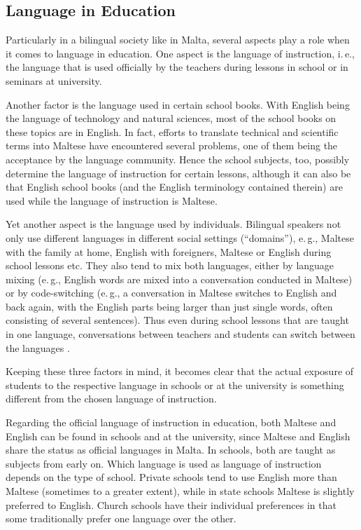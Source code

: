 \begin{multicols}{2}
\subsection{Language in Education}

Particularly in a bilingual society like in Malta, several aspects play a role when it comes to language in education. 
%
One aspect is the language of instruction, i.\,e., the language that is used officially by the teachers during lessons in school or in seminars at university. 

Another factor is the language used in certain school books. With English being the language of technology and natural sciences, most of the school books on these topics are in English. In fact, efforts to translate technical and scientific terms into Maltese have encountered several problems, one of them being the acceptance by the language community. Hence the school subjects, too, possibly determine the language of instruction for certain lessons, although it can also be that English school books (and the English terminology contained therein) are used while the language of instruction is Maltese.

Yet another aspect is the language used by individuals. Bilingual speakers not only use different languages in different social settings (``domains''), e.\,g., Maltese with the family at home, English with foreigners, Maltese or English during school lessons etc. They also tend to mix both languages, either by language mixing (e.\,g., English words are mixed into a conversation conducted in Maltese) or by code-switching (e.\,g., a conversation in Maltese switches to English and back again, with the English parts being larger than just single words, often consisting of several sentences). Thus even during school lessons that are taught in one language, conversations between teachers and students can switch between the languages \cite{Camilleri:1995}.

Keeping these three factors in mind, it becomes clear that the actual exposure of students to the respective language in schools or at the university is something different from the chosen language of instruction.

Regarding the official language of instruction in education, both Maltese and English can be found in schools and at the university, since Maltese and English share the status as official languages in Malta. In schools, both are taught as subjects from early on. Which language is used as language of instruction depends on the type of school. Private schools tend to use English more than Maltese (sometimes to a greater extent), while in state schools Maltese is slightly preferred to English. Church schools have their individual preferences in that some traditionally prefer one language over the other. 


\end{multicols}

